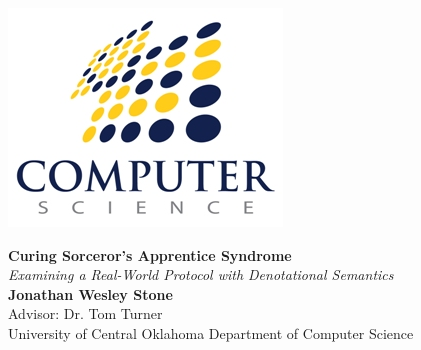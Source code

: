 \documentclass[a0,landscape]{a0poster}
\begin{document}

\begin{figure}[!htb]
\begin{minipage}[b]{0.19\linewidth}
\includegraphics[height=.8\columnwidth,keepaspectratio]{csdept_logo.png} %
\end{minipage}
%
\hspace{9cm}
\begin{minipage}[b]{0.59\linewidth}
\veryHuge \color{NavyBlue} \textbf{Curing Sorceror's Apprentice Syndrome} \color{Black}\\ %
\Huge\textit{Examining a Real-World Protocol with Denotational Semantics}\\[1cm] %
\huge \textbf{Jonathan Wesley Stone}\\ %
\huge Advisor: Dr. Tom Turner\\
\huge University of Central Oklahoma Department of Computer Science\\ %
\end{minipage}
%
\begin{minipage}[b]{0.19\linewidth}

\end{minipage}
\end{figure}
\end{document}
